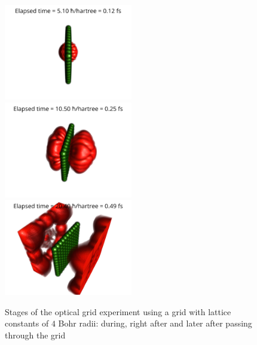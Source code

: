 \begin{figure}
	\begin{center}
		\includegraphics[width=0.5\textwidth]{figures/optical_grid_01.png}
		\includegraphics[width=0.5\textwidth]{figures/optical_grid_02.png}
		\includegraphics[width=0.5\textwidth]{figures/optical_grid_03.png}
		\caption{Stages of the optical grid experiment using a grid with lattice constants of $4$ Bohr radii: during, right after and later after passing through the grid}
		\label{fig:optical_grid_stages}
	\end{center}	
\end{figure}
